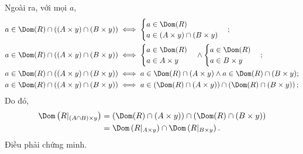 Ngoài ra, với mọi $a$, 
\begin{align*}
   a \in \Dom(R) \cap ((A \times y) \cap (B \times y)) &\iff \begin{cases}
      a \in \Dom(R) \\
      a \in (A \times y) \cap (B \times y)
   \end{cases}; \\
   a \in \Dom(R) \cap ((A \times y) \cap (B \times y)) &\iff \begin{cases}
      a \in \Dom(R) \\
      a \in A \times y
   \end{cases} \land \begin{cases}
      a \in \Dom(R) \\
      a \in B \times y
   \end{cases}; \\
   a \in \Dom(R) \cap ((A \times y) \cap (B \times y)) &\iff a \in \Dom(R) \cap (A \times y) \land a \in \Dom(R) \cap (B \times y); \\
   a \in \Dom(R) \cap ((A \times y) \cap (B \times y)) &\iff a \in \left( \Dom(R) \cap (A \times y) \right) \cap \left( \Dom(R) \cap (B \times y) \right); \\
\end{align*}
Do đó, \begin{align*}
   \Dom\left(R|_{(A \cap B) \times y}\right) &= \left( \Dom(R) \cap (A \times y) \right) \cap \left( \Dom(R) \cap (B \times y) \right) \\
      &= \Dom\left(R|_{A \times y}\right) \cap \Dom\left(R|_{B \times y}\right).
\end{align*}
Điều phải chứng minh.

